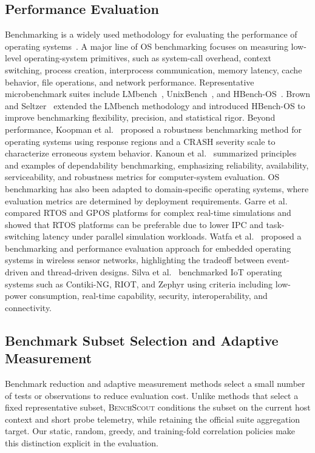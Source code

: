 \documentclass[sigplan,10pt]{acmart}
\newcommand{\ourmethod}{\textsc{BenchScout}\xspace}
\begin{document}
\subsection{Performance Evaluation}
Benchmarking is a widely used methodology for evaluating the performance of operating systems~\cite{hatt2007benchmarking}. 
A major line of OS benchmarking focuses on measuring low-level operating-system primitives, such as system-call overhead, context switching, process creation, interprocess communication, memory latency, cache behavior, file operations, and network performance. 
Representative microbenchmark suites include LMbench~\cite{brown1997operating}, UnixBench~\cite{smith2011byte}, and HBench-OS~\cite{hatt2007benchmarking}. 
Brown and Seltzer~\cite{brown1997operating} extended the LMbench methodology and introduced HBench-OS to improve benchmarking flexibility, precision, and statistical rigor. 
Beyond performance, Koopman et al.~\cite{koopman1997comparing} proposed a robustness benchmarking method for operating systems using response regions and a CRASH severity scale to characterize erroneous system behavior. 
Kanoun et al.~\cite{kanoun2006dependability} summarized principles and examples of dependability benchmarking, emphasizing reliability, availability, serviceability, and robustness metrics for computer-system evaluation. OS benchmarking has also been adapted to domain-specific operating systems, where evaluation metrics are determined by deployment requirements. 
Garre et al.~\cite{garre2014performance} compared RTOS and GPOS platforms for complex real-time simulations and showed that RTOS platforms can be preferable due to lower IPC and task-switching latency under parallel simulation workloads. 
Watfa et al.~\cite{watfa2014benchmarking} proposed a benchmarking and performance evaluation approach for embedded operating systems in wireless sensor networks, highlighting the tradeoff between event-driven and thread-driven designs. 
Silva et al.~\cite{silva2019operating} benchmarked IoT operating systems such as Contiki-NG, RIOT, and Zephyr using criteria including low-power consumption, real-time capability, security, interoperability, and connectivity. 

\subsection{Benchmark Subset Selection and Adaptive Measurement}
Benchmark reduction and adaptive measurement methods select a small number of tests or observations to reduce evaluation cost.  Unlike methods that select a fixed representative subset, \ourmethod{} conditions the subset on the current host context and short probe telemetry, while retaining the official suite aggregation target.  Our static, random, greedy, and training-fold correlation policies make this distinction explicit in the evaluation.
\end{document}
